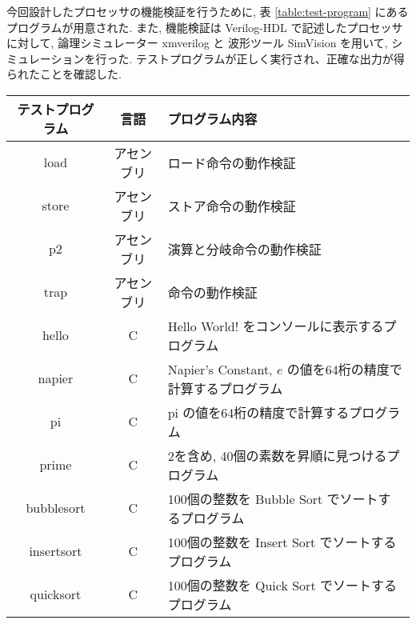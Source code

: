 \documentclass[../main.tex]{subfiles}
\begin{document}
  今回設計したプロセッサの機能検証を行うために, 
  表 \ref{table:test-program} にあるプログラムが用意された.
  また, 機能検証は Verilog-HDL で記述したプロセッサに対して, 
  論理シミュレーター xmverilog と
  波形ツール SimVision を用いて, シミュレーションを行った.
  テストプログラムが正しく実行され、正確な出力が得られたことを確認した.

  \begin{table*}[t]
    \centering
    \begin{tabular}{|c|c|l|}
    \hline
    テストプログラム & 言語 & プログラム内容 \\ \hline
    load & アセンブリ & ロード命令の動作検証 \\
    store & アセンブリ & ストア命令の動作検証 \\
    p2 & アセンブリ & 演算と分岐命令の動作検証 \\
    trap & アセンブリ & 命令の動作検証 \\
    hello & C & Hello World! をコンソールに表示するプログラム \\
    napier & C & Napier's Constant, $e$ の値を64桁の精度で計算するプログラム \\
    pi & C & pi の値を64桁の精度で計算するプログラム \\
    prime & C & 2を含め, 40個の素数を昇順に見つけるプログラム \\
    bubblesort & C & 100個の整数を Bubble Sort でソートするプログラム \\
    insertsort & C & 100個の整数を Insert Sort でソートするプログラム \\
    quicksort & C & 100個の整数を Quick Sort でソートするプログラム \\ \hline
    \end{tabular}
    \caption{機能検証用テストプログラム}
    \label{table:test-program}
  \end{table*}
\end{document}

